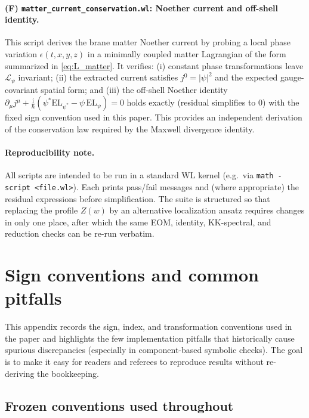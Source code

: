 \documentclass[11pt]{article}
\newcommand{\ii}{\mathrm i}
\newcommand{\Z}{Z}
\begin{document}
\paragraph{(F) \texttt{matter\_current\_conservation.wl}: Noether current and off-shell identity.}
This script derives the brane matter Noether current by probing a local phase
variation \(\epsilon(t,x,y,z)\) in a minimally coupled matter Lagrangian of the
form summarized in \cref{eq:L_matter}. It verifies:
(i) constant phase transformations leave \(\mathcal L_\psi\) invariant;
(ii) the extracted current satisfies \(j^0=|\psi|^2\) and the expected
gauge-covariant spatial form; and (iii) the off-shell Noether identity
\(\partial_\mu j^\mu + \frac{\ii}{\hbar}(\psi^*\mathrm{EL}_{\psi^*}-\psi\,\mathrm{EL}_\psi)=0\)
holds exactly (residual simplifies to \(0\)) with the fixed sign convention used
in this paper. This provides an independent derivation of the conservation law
required by the Maxwell divergence identity.

\paragraph{Reproducibility note.}
All scripts are intended to be run in a standard WL kernel (e.g.\ via
\texttt{math -script <file.wl>}). Each prints pass/fail messages and (where
appropriate) the residual expressions before simplification. The suite is
structured so that replacing the profile \(\Z(w)\) by an alternative localization
ansatz requires changes in only one place, after which the same EOM, identity,
KK-spectral, and reduction checks can be re-run verbatim.

\section{Sign conventions and common pitfalls}
\label{app:conventions_pitfalls}

This appendix records the sign, index, and transformation conventions used in the
paper and highlights the few implementation pitfalls that historically cause
spurious discrepancies (especially in component-based symbolic checks). The goal
is to make it easy for readers and referees to reproduce results without
re-deriving the bookkeeping.

\subsection{Frozen conventions used throughout}
\end{document}
